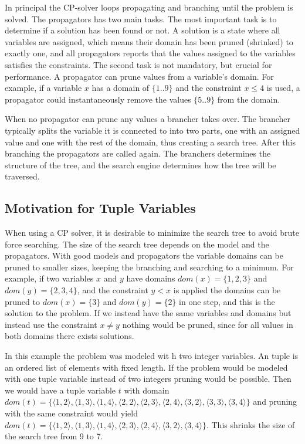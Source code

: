 \documentclass[a4paper,11pt]{article}
\begin{document}
In principal the CP-solver loops propagating and branching until the problem is solved. The propagators has two main tasks. The most important task is to determine if a solution has been found or not. A solution is a state where all variables are assigned, which means their domain has been pruned (shrinked) to exactly one, and all propagators reports that the values assigned to the variables satisfies the constraints. The second task is not mandatory, but crucial for performance. A propagator can prune values from a variable's domain. For example, if a variable $x$ has a domain of $\{1..9\}$ and the constraint $x\le 4$ is used, a propagator could instantaneously remove the values $\{5..9\}$ from the domain.

When no propagator can prune any values a brancher takes over. The brancher typically splits the variable it is connected to into two parts, one with an assigned value and one with the rest of the domain, thus creating a search tree. After this branching the propagators are called again. The branchers determines the structure of the tree, and the search engine determines how the tree will be traversed. 

\subsection{Motivation for Tuple Variables}
When using a CP solver, it is desirable to minimize the search tree to avoid brute force searching. The size of the search tree depends on the model and the propagators. With good models and propagators the variable domains can be pruned to smaller sizes, keeping the branching and searching to a minimum. For example, if two variables $x$ and $y$ have domains $dom(x)=\{1,2,3\}$ and $dom(y)=\{2,3,4\}$, and the constraint $y<x$ is applied the domains can be pruned to $dom(x)=\{3\}$ and $dom(y)=\{2\}$ in one step, and this is the solution to the problem. If we instead have the same variables and domains but instead use the constraint $x\neq y$ nothing would be pruned, since for all values in both domains there exists solutions. 

In this example the problem was modeled wit h two integer variables. An tuple is an ordered list of elements with fixed length. If the problem would be modeled with one tuple variable instead of two integers pruning would be possible. Then we would have a tuple variable $t$ with domain $dom(t)=\{\langle1,2\rangle,\langle1,3\rangle,\langle1,4\rangle,\langle2,2\rangle,\langle2,3\rangle,\langle2,4\rangle,\langle3,2\rangle,\langle3,3\rangle,\langle3,4\rangle\}$ and pruning with the same constraint would yield $dom(t)=\{\langle1,2\rangle,\langle1,3\rangle,\langle1,4\rangle,\langle2,3\rangle,\langle2,4\rangle,\langle3,2\rangle,\langle3,4\rangle\}$. This shrinks the size of the search tree from 9 to 7. 
\end{document}
